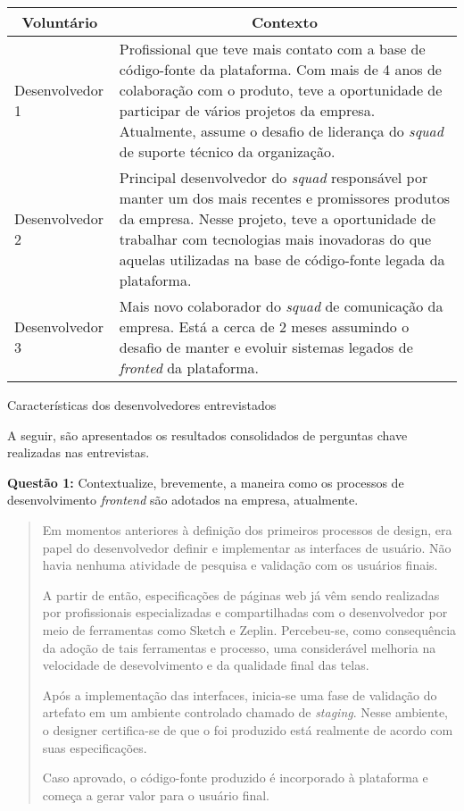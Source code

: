 \begin{quadro}
\centering
\begin{tabular}{|m{4cm}|m{10cm}|} \hline
	
	\multicolumn{1}{|c|}{\bfseries Voluntário} & \multicolumn{1}{c|}{\bfseries Contexto} \\\hline
	
	 Desenvolvedor 1 & Profissional que teve mais contato com a base de código-fonte da plataforma. Com mais de 4 anos de colaboração com o produto, teve a oportunidade de participar de vários projetos da empresa. Atualmente, assume o desafio de liderança do \textit{squad} de suporte técnico da organização. \\\hline
	 
	 Desenvolvedor 2 & Principal desenvolvedor do \textit{squad} responsável por manter um dos mais recentes e promissores produtos da empresa. Nesse projeto, teve a oportunidade de trabalhar com tecnologias mais inovadoras do que aquelas utilizadas na base de código-fonte legada da plataforma. \\\hline
	 
	 Desenvolvedor 3 & Mais novo colaborador do \textit{squad} de comunicação da empresa. Está a cerca de 2 meses assumindo o desafio de manter e evoluir sistemas legados de \textit{fronted} da plataforma. \\\hline
    
\end{tabular}
\caption{Características dos desenvolvedores entrevistados}
\label{table:devsResearch}
\end{quadro}

A seguir, são apresentados os resultados consolidados de perguntas chave realizadas nas entrevistas.

\textbf{Questão 1:} Contextualize, brevemente, a maneira como os processos de desenvolvimento \textit{frontend} são adotados na empresa, atualmente.

\begin{quote}
    Em momentos anteriores à definição dos primeiros processos de design, era papel do desenvolvedor definir e implementar as interfaces de usuário. Não havia nenhuma atividade de pesquisa e validação com os usuários finais.
    
    A partir de então, especificações de páginas web já vêm sendo realizadas por profissionais especializadas e compartilhadas com o desenvolvedor por meio de ferramentas como Sketch e Zeplin. Percebeu-se, como consequência da adoção de tais ferramentas e processo, uma considerável melhoria na velocidade de desevolvimento e da qualidade final das telas.
    
    Após a implementação das interfaces, inicia-se uma fase de validação do artefato em um ambiente controlado chamado de \textit{staging}. Nesse ambiente, o designer certifica-se de que o foi produzido está realmente de acordo com suas especificações.
    
    Caso aprovado, o código-fonte produzido é incorporado à plataforma e começa a gerar valor para o usuário final.
\end{quote}

